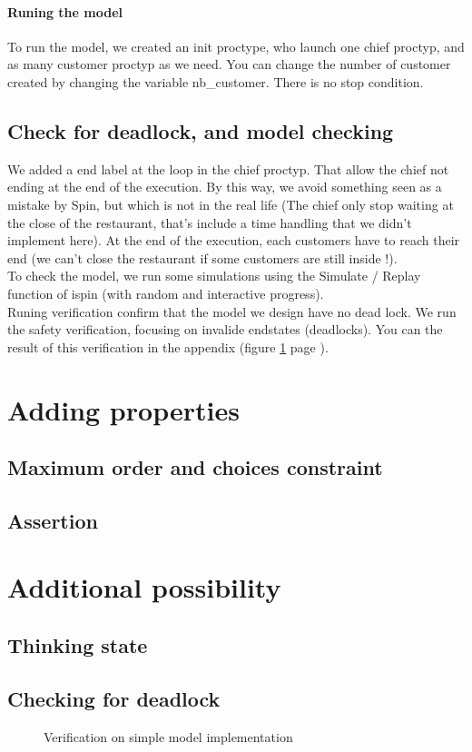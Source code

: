 \documentclass[a4paper,11pt]{article} %
\begin{document}
\paragraph{Runing the model}
To run the model, we created an init proctype, who launch one chief proctyp, and as many customer proctyp as we need. You can change the number of customer created by changing the variable nb\_customer. There is no stop condition.
\subsection{Check for deadlock, and model checking}
We added a end label at the loop in the chief proctyp. That allow the chief not ending at the end of the execution. By this way, we avoid something seen as a mistake by Spin, but which is not in the real life (The chief only stop waiting at the close of the restaurant, that's include a time handling that we didn't implement here). At the end of the execution, each customers have to reach their end (we can't close the restaurant if some customers are still inside !).\\
To check the model, we run some simulations using the Simulate / Replay function of ispin (with random and interactive progress).\\
Runing verification confirm that the model we design have no dead lock. We run the safety verification, focusing on invalide endstates (deadlocks). You can the result of this verification in the appendix (figure \ref{verifA} page \pageref{verifA}).
\newpage
\section{Adding properties}
\subsection{Maximum order and choices constraint}
\subsection{Assertion}
\newpage
\section{Additional possibility}
\subsection{Thinking state}
\subsection{Checking for deadlock}

\newpage
\appendix
\begin{figure}
\caption{Verification on simple model implementation\label{verifA}}
\end{figure}

\end{document}
